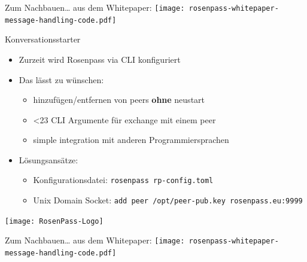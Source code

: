 \documentclass[german]{rosenpass-beamer}
\begin{document}
\begin{frame}{Zum Nachbauen… aus dem Whitepaper:}
  \texttt{[image: rosenpass-whitepaper-message-handling-code.pdf]}
\end{frame}

\begin{frame}{Konversationsstarter}

\begin{itemize}
\item
  Zurzeit wird Rosenpass via CLI konfiguriert
\item
  Das lässt zu wünschen:
  \begin{itemize}
  \item
    hinzufügen/entfernen von peers \textbf{ohne} neustart
  \item\relax
    <23 CLI Argumente für exchange mit einem peer
  \item
    simple integration mit anderen Programmiersprachen
  \end{itemize}
\item
  Lösungsansätze:
  \begin{itemize}
  \item
    Konfigurationsdatei: \texttt{rosenpass\ rp-config.toml}
  \item
    Unix Domain Socket:
    \texttt{add\ peer\ /opt/peer-pub.key\ rosenpass.eu:9999}
  \end{itemize}
\end{itemize}
\end{frame}


\edef\totalcontentframes{\theframenumber}


\appendix

\begin{frame}
\centering
\texttt{[image: RosenPass-Logo]}\end{frame}


\begin{frame}{Zum Nachbauen… aus dem Whitepaper:}
  \texttt{[image: rosenpass-whitepaper-message-handling-code.pdf]}
\end{frame}
\end{document}
